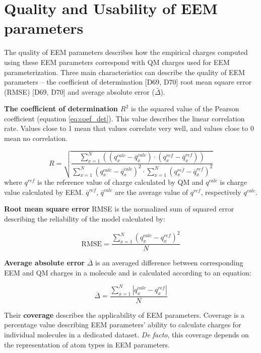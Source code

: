 \section{Quality and Usability of EEM parameters}

The quality of EEM parameters describes how the empirical charges computed
using these EEM parameters correspond with QM charges used for EEM
parameterization. Three main characteristics can describe the quality of
EEM parameters -- the coefficient of determination [D69, D70] root mean
square error (RMSE) [D69, D70] and average absolute error ($\bar{\Delta}$).

\textbf{The coefficient of determination $R^2$} is the squared value of the
Pearson coefficient (equation \ref{eq:coef_det}). This value describes the
linear correlation rate. Values close to 1 mean that values correlate very well,
and values close to 0 mean no correlation.

\begin{equation} \label{eq:coef_det}
    R = \sqrt{\frac{
        \sum^N_{x=1}{((q^{calc}_x - \overline{q}^{calc}_x) \cdot (q^{ref}_x - \overline{q}^{ref}_x))}
    }{
        \sum^N_{x=1}{(q^{calc}_x - \overline{q}^{calc}_x)^2} \cdot \sum^N_{x=1}{(q^{ref}_x - \overline{q}^{ref}_x)^2}
    }}
\end{equation}
where $q^{ref}$ is the reference value of charge calculated by QM and $q^{calc}$
is charge value calculated by EEM. $\overline{q}^{ref}$, $\overline{q}^{calc}$
are the average value of $q^{ref}$, respectively $q^{calc}$.

\textbf{Root mean square error} RMSE is the normalized sum of squared error
describing the reliability of the model calculated by:

\begin{equation}
    \mathrm{RMSE} = \frac{
        \sum^N_{x=1}{(q^{calc}_x - q^{ref}_x)^2}
    }{
        N
    }
\end{equation}

\textbf{Average absolute error} $\overline{\Delta}$ is an averaged difference
between corresponding EEM and QM charges in a molecule and is calculated
according to an equation:

\begin{equation}
    \overline{\Delta} = \frac{
        \sum^N_{x=1}{|q^{calc}_x - q^{ref}_x|}
    }{
        N
    }
\end{equation}

Their \textbf{coverage} describes the applicability of EEM parameters.
Coverage is a percentage value describing EEM parameters' ability to calculate
charges for individual molecules in a dedicated dataset. \textit{De facto},
this coverage depends on the representation of atom types in EEM parameters.

